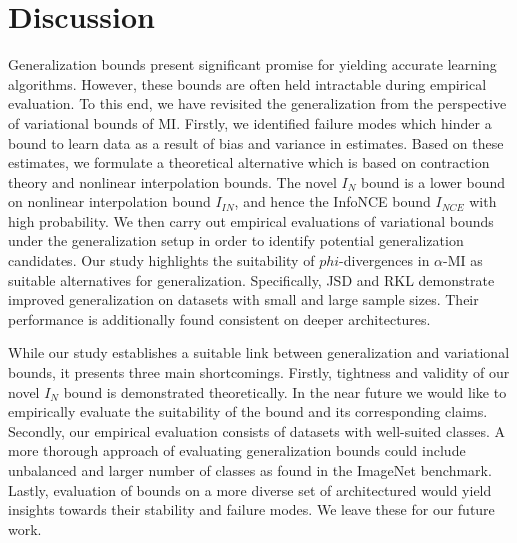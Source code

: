 \documentclass{article}
\begin{document}
\section{Discussion}
Generalization bounds present significant promise for yielding accurate learning algorithms. However, these bounds are often held intractable during empirical evaluation. To this end, we have revisited the generalization from the perspective of variational bounds of MI. Firstly, we identified failure modes which hinder a bound to learn data as a result of bias and variance in estimates. Based on these estimates, we formulate a theoretical alternative which is based on contraction theory and nonlinear interpolation bounds. The novel $I_{N}$ bound is a lower bound on nonlinear interpolation bound $I_{IN}$, and hence the InfoNCE bound $I_{NCE}$ with high probability. We then carry out empirical evaluations of variational bounds under the generalization setup in order to identify potential generalization candidates. Our study highlights the suitability of $phi$-divergences in $\alpha$-MI as suitable alternatives for generalization. Specifically, JSD and RKL demonstrate improved generalization on datasets with small and large sample sizes. Their performance is additionally found consistent on deeper architectures. 

While our study establishes a suitable link between generalization and variational bounds, it presents three main shortcomings. Firstly, tightness and validity of our novel $I_{N}$ bound is demonstrated theoretically. In the near future we would like to empirically evaluate the suitability of the bound and its corresponding claims. Secondly, our empirical evaluation consists of datasets with well-suited classes. A more thorough approach of evaluating generalization bounds could include unbalanced and larger number of classes as found in the ImageNet benchmark. Lastly, evaluation of bounds on a more diverse set of architectured would yield insights towards their stability and failure modes. We leave these for our future work.  

 
\small{}

\newpage
\appendix
\end{document}
